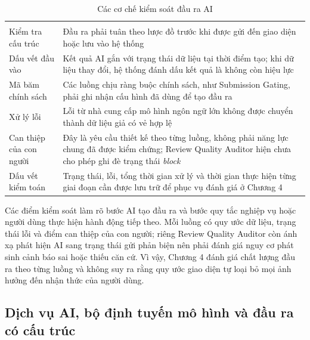 \begingroup
\setlength{\tabcolsep}{2pt}
\renewcommand{\arraystretch}{1.15}
\begin{longtable}{|C{0.46\textwidth}|P{0.46\textwidth}|}
  \caption{Các cơ chế kiểm soát đầu ra AI}\label{tab:ch3-ai-controls}\\
  \hline
       &     \\ \hline
  \endfirsthead
  \hline
       &     \\ \hline
  \endhead
  Kiểm tra cấu trúc   &   Đầu ra phải tuân theo lược đồ trước khi được gửi đến giao diện hoặc lưu vào hệ thống \\ \hline
  Dấu vết đầu vào      &      Kết quả AI gắn với trạng thái dữ liệu tại thời điểm tạo; khi dữ liệu thay đổi, hệ thống đánh dấu kết quả là không còn hiệu lực \\ \hline
  Mã băm chính sách     &     Các luồng chịu ràng buộc chính sách, như Submission Gating, phải ghi nhận cấu hình đã dùng để tạo đầu ra \\ \hline
  Xử lý lỗi      &      Lỗi từ nhà cung cấp mô hình ngôn ngữ lớn không được chuyển thành dữ liệu giả có vẻ hợp lệ \\ \hline
  Can thiệp của con người     &     Đây là yêu cầu thiết kế theo từng luồng, không phải năng lực chung đã được kiểm chứng; Review Quality Auditor hiện chưa cho phép ghi đè trạng thái \textit{block} \\ \hline
  Dấu vết kiểm toán      &      Trạng thái, lỗi, tổng thời gian xử lý và thời gian thực hiện từng giai đoạn cần được lưu trữ để phục vụ đánh giá ở Chương 4 \\ \hline
\end{longtable}
\endgroup

Các điểm kiểm soát làm rõ bước AI tạo đầu ra và bước quy tắc nghiệp vụ hoặc người dùng thực hiện hành động tiếp theo. Mỗi luồng có quy ước dữ liệu, trạng thái lỗi và điểm can thiệp của con người; riêng Review Quality Auditor còn ánh xạ phát hiện AI sang trạng thái gửi phản biện nên phải đánh giá nguy cơ phát sinh cảnh báo sai hoặc thiếu căn cứ. Vì vậy, Chương 4 đánh giá chất lượng đầu ra theo từng luồng và không suy ra rằng quy ước giao diện tự loại bỏ mọi ảnh hưởng đến nhận thức của người dùng.

\subsection{Dịch vụ AI, bộ định tuyến mô hình và đầu ra có cấu trúc}

